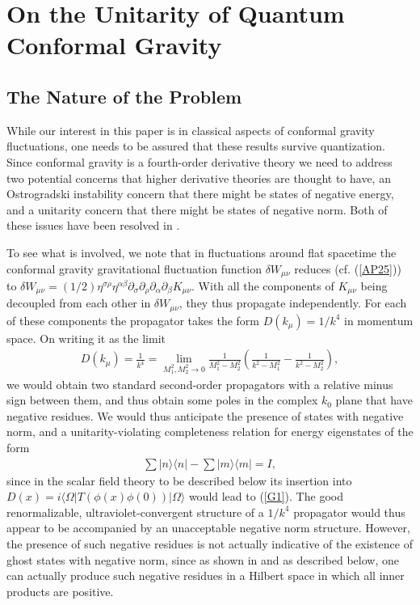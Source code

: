\documentclass[aps]{revtex4}
\begin{document}
\section{On the Unitarity of Quantum Conformal Gravity}
\label{SG}

\subsection{The Nature of the Problem}

While our interest in this paper is in classical aspects of conformal gravity fluctuations, one needs to be assured that these results survive quantization. Since conformal gravity is a fourth-order derivative theory we need to address two potential concerns that higher derivative theories are thought to have, an Ostrogradski instability concern that there might be states of negative energy, and a unitarity concern that there might be states of negative norm. Both of these issues have been resolved in  \cite{Bender2008a,Bender2008b,Mannheim2011a,Mannheim2018}.

To see what is involved, we note that in fluctuations around flat spacetime the conformal gravity gravitational fluctuation function $\delta W_{\mu\nu}$ reduces (cf. (\ref{AP25})) to $\delta W_{\mu\nu}=(1/2)\eta^{\sigma\rho}\eta^{\alpha\beta}\partial_{\sigma}\partial_{\rho} \partial_{\alpha}\partial_{\beta}K_{\mu \nu}$. With all the components of $K_{\mu\nu}$ being decoupled from each other in $\delta W_{\mu\nu}$, they thus propagate independently. For each of these components the  propagator takes the form $D(k_{\mu})=1/k^4$ in momentum space. On writing it as the limit 
%
\begin{eqnarray}
D(k_{\mu})=\frac{1}{k^4}=\lim_{M_1^2,M_2^2\rightarrow 0} \frac{1}{M_1^2-M_2^2}\left(\frac{1}{k^2-M_1^2}-\frac{1}{k^2-M_2^2}\right),
\label{G1}
\end{eqnarray}
%
we would obtain two standard second-order propagators with a relative minus sign between them, and thus obtain some poles in the complex $k_0$ plane that have negative residues. We would thus anticipate the presence of states with negative norm, and a unitarity-violating completeness relation for energy eigenstates of the form 
%
\begin{eqnarray}
\sum |n\rangle\langle n|-\sum |m\rangle\langle m|=I,
\label{G2}
\end{eqnarray}
%
since in the scalar field theory to be described below its insertion into $D(x)=i\langle \Omega|T(\phi(x)\phi(0))|\Omega\rangle$ would lead to (\ref{G1}). The good renormalizable, ultraviolet-convergent structure of a $1/k^4$ propagator would thus appear to be accompanied by an unacceptable negative norm structure. However, the presence of such negative residues is not actually indicative of the existence of ghost states with negative norm, since as  shown in \cite{Bender2008a,Bender2008b} and as described below, one can actually produce such negative residues in a Hilbert space in which all inner products are positive.
\end{document}
